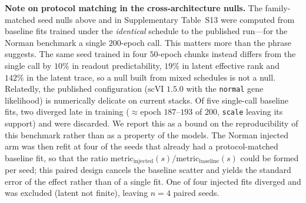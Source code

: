 \documentclass[11 pt,a4 paper]{article}
\begin{document}
\textbf{Note on protocol matching in the cross-architecture nulls.} The family-matched seed nulls above and in Supplementary Table~S13 were computed from baseline fits trained under the \emph{identical} schedule to the published run---for the Norman benchmark a single $200$-epoch call. This matters more than the phrase suggests. The same seed trained in four $50$-epoch chunks instead differs from the single call by $10\%$ in readout predictability, $19\%$ in latent effective rank and $142\%$ in the latent trace, so a null built from mixed schedules is not a null. Relatedly, the published configuration ($\mathrm{scVI}$ $1.5.0$ with the \texttt{normal} gene likelihood) is numerically delicate on current stacks. Of five single-call baseline fits, two diverged late in training ($\approx$epoch $187$--$193$ of $200$, \texttt{scale} leaving its support) and were discarded. We report this as a bound on the reproducibility of this benchmark rather than as a property of the models. The Norman injected arm was then refit at four of the seeds that already had a protocol-matched baseline fit, so that the ratio $\mathrm{metric}_{\mathrm{injected}}(s)/\mathrm{metric}_{\mathrm{baseline}}(s)$ could be formed per seed; this paired design cancels the baseline scatter and yields the standard error of the effect rather than of a single fit. One of four injected fits diverged and was excluded (latent not finite), leaving $n=4$ paired seeds.


\clearpage
\end{document}
